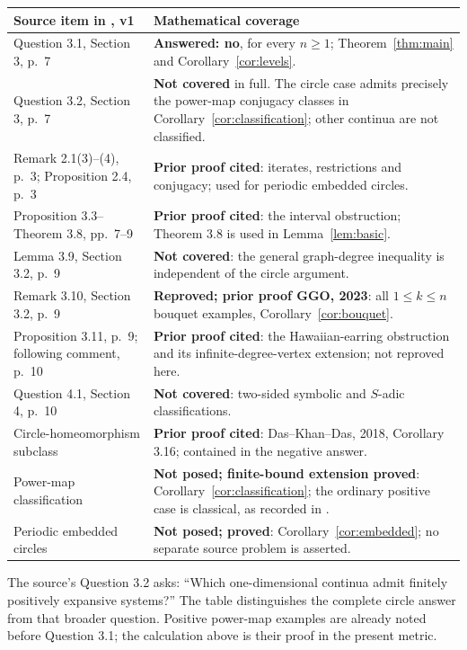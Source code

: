 \documentclass[11pt]{article}
\begin{document}
\begin{center}\small
\begin{tabular}{@{}p{}p{}@{}}
\toprule
Source item in \cite{GGO}, v1 & Mathematical coverage\\
\midrule
Question 3.1, Section 3, p.~7 & \textbf{Answered: no}, for every $n\ge1$; Theorem~\ref{thm:main} and Corollary~\ref{cor:levels}.\\
Question 3.2, Section 3, p.~7 & \textbf{Not covered} in full. The circle case admits precisely the power-map conjugacy classes in Corollary~\ref{cor:classification}; other continua are not classified.\\
Remark 2.1(3)--(4), p.~3; Proposition 2.4, p.~3 & \textbf{Prior proof cited}: iterates, restrictions and conjugacy; used for periodic embedded circles.\\
Proposition 3.3--Theorem 3.8, pp.~7--9 & \textbf{Prior proof cited}: the interval obstruction; Theorem 3.8 is used in Lemma~\ref{lem:basic}.\\
Lemma 3.9, Section 3.2, p.~9 & \textbf{Not covered}: the general graph-degree inequality is independent of the circle argument.\\
Remark 3.10, Section 3.2, p.~9 & \textbf{Reproved; prior proof GGO, 2023}: all $1\le k\le n$ bouquet examples, Corollary~\ref{cor:bouquet}.\\
Proposition 3.11, p.~9; following comment, p.~10 & \textbf{Prior proof cited}: the Hawaiian-earring obstruction and its infinite-degree-vertex extension; not reproved here.\\
Question 4.1, Section 4, p.~10 & \textbf{Not covered}: two-sided symbolic and $S$-adic classifications.\\
Circle-homeomorphism subclass & \textbf{Prior proof cited}: Das--Khan--Das, 2018, Corollary 3.16; contained in the negative answer.\\
Power-map classification & \textbf{Not posed; finite-bound extension proved}: Corollary~\ref{cor:classification}; the ordinary positive case is classical, as recorded in \cite{LN}.\\
Periodic embedded circles & \textbf{Not posed; proved}: Corollary~\ref{cor:embedded}; no separate source problem is asserted.\\
\bottomrule
\end{tabular}
\end{center}
The source's Question 3.2 asks: ``Which one-dimensional continua admit
finitely positively expansive systems?'' The table distinguishes the
complete circle answer from that broader question. Positive power-map
examples are already noted before Question 3.1; the calculation above is
their proof in the present metric.
\end{document}

